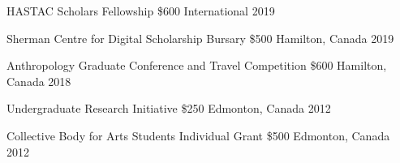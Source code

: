 

\begin{cvhonors}

  \cvhonor
    {HASTAC Scholars Fellowship} %
    {\$600} %
    {International} %
    {2019} %
    
                        
  \cvhonor
    {Sherman Centre for Digital Scholarship Bursary} %
    {\$500} %
    {Hamilton, Canada} %
    {2019} %
         
  \cvhonor
    {Anthropology Graduate Conference and Travel Competition} %
    {\$600} %
    {Hamilton, Canada} %
    {2018} %
    
   \cvhonor
    {Undergraduate Research Initiative} %
    {\$250} %
    {Edmonton, Canada} %
    {2012} %
           
  \cvhonor
    {Collective Body for Arts Students Individual Grant} %
    {\$500} %
    {Edmonton, Canada} %
    {2012} %
        
\end{cvhonors}
   


